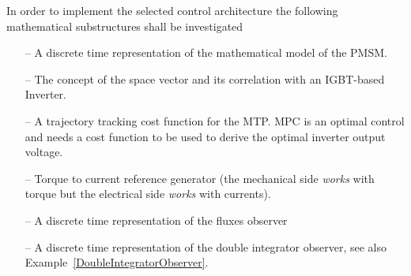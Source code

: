 \documentclass[11pt,a4paper,oneside]{book}
\numberwithin{equation}{section}
\theoremstyle{it}
\theoremstyle{definition}
\begin{document}
In order to implement the selected control architecture the following 
mathematical substructures shall be investigated
\begin{itemize}
	\item[--] A discrete time representation of the mathematical model of the 
	PMSM.
	\item[--] The concept of the space vector and its correlation with an 
	IGBT-based Inverter.
	\item[--] A trajectory tracking cost function for the MTP. MPC is an 
	optimal control and needs a cost function to be used to derive the optimal 
	inverter output voltage.
	\item[--] Torque to current reference generator (the mechanical side 
	\textit{works} with torque but the electrical side \textit{works} with 
	currents).
	\item[--] A discrete time representation of the fluxes observer
	\item[--] A discrete time representation of the double integrator observer, see also Example~\ref{DoubleIntegratorObserver}.
\end{itemize}
\end{document}
